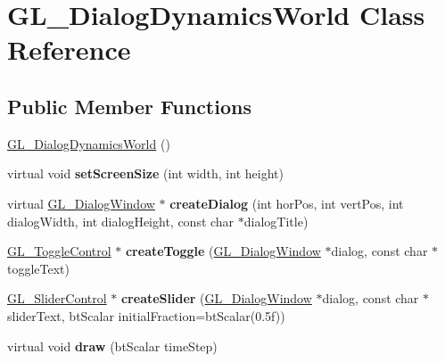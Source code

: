 \hypertarget{class_g_l___dialog_dynamics_world}{\section{G\+L\+\_\+\+Dialog\+Dynamics\+World Class Reference}
\label{class_g_l___dialog_dynamics_world}
}
\subsection*{Public Member Functions}
\begin{DoxyCompactItemize}
\item 
\hyperlink{class_g_l___dialog_dynamics_world_ae57bf53e528e5085eac4647fd6893b21}{G\+L\+\_\+\+Dialog\+Dynamics\+World} ()
\item 
\hypertarget{class_g_l___dialog_dynamics_world_abd8660d13c53f82e4958a76177a06625}{virtual void {\bfseries set\+Screen\+Size} (int width, int height)}\label{class_g_l___dialog_dynamics_world_abd8660d13c53f82e4958a76177a06625}

\item 
\hypertarget{class_g_l___dialog_dynamics_world_a21487c8955c6610882fed76ee2f4ff2a}{virtual \hyperlink{class_g_l___dialog_window}{G\+L\+\_\+\+Dialog\+Window} $\ast$ {\bfseries create\+Dialog} (int hor\+Pos, int vert\+Pos, int dialog\+Width, int dialog\+Height, const char $\ast$dialog\+Title)}\label{class_g_l___dialog_dynamics_world_a21487c8955c6610882fed76ee2f4ff2a}

\item 
\hypertarget{class_g_l___dialog_dynamics_world_a9254177a006898a9d226dba46749cd74}{\hyperlink{struct_g_l___toggle_control}{G\+L\+\_\+\+Toggle\+Control} $\ast$ {\bfseries create\+Toggle} (\hyperlink{class_g_l___dialog_window}{G\+L\+\_\+\+Dialog\+Window} $\ast$dialog, const char $\ast$toggle\+Text)}\label{class_g_l___dialog_dynamics_world_a9254177a006898a9d226dba46749cd74}

\item 
\hypertarget{class_g_l___dialog_dynamics_world_a17f8e716449e92c741ebd091b54ecc94}{\hyperlink{struct_g_l___slider_control}{G\+L\+\_\+\+Slider\+Control} $\ast$ {\bfseries create\+Slider} (\hyperlink{class_g_l___dialog_window}{G\+L\+\_\+\+Dialog\+Window} $\ast$dialog, const char $\ast$slider\+Text, bt\+Scalar initial\+Fraction=bt\+Scalar(0.\+5f))}\label{class_g_l___dialog_dynamics_world_a17f8e716449e92c741ebd091b54ecc94}

\item 
\hypertarget{class_g_l___dialog_dynamics_world_a023065bc2c9300a4120862f198fdcba5}{virtual void {\bfseries draw} (bt\+Scalar time\+Step)}\label{class_g_l___dialog_dynamics_world_a023065bc2c9300a4120862f198fdcba5}


\end{DoxyCompactItemize}
